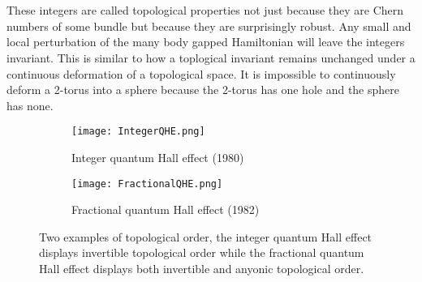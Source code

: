 \\\\
These integers are called topological properties not just because they are Chern numbers of some bundle but because they are surprisingly robust. Any small and local perturbation of the many body gapped Hamiltonian will leave the integers invariant. This is similar to how a toplogical invariant remains unchanged under a continuous deformation of a topological space. It is impossible to continuously deform a 2-torus into a sphere because the 2-torus has one hole and the sphere has none.
\begin{figure}
	\centering
	\begin{subfigure}[b]{0.45\textwidth}
		\centering
		\texttt{[image: IntegerQHE.png]}
		\caption{Integer quantum Hall effect (1980)}
	\end{subfigure}
	\hfill
	\begin{subfigure}[b]{0.45\textwidth}
		\centering
		\texttt{[image: FractionalQHE.png]}
		\caption{Fractional quantum Hall effect (1982)}
	\end{subfigure}
	\caption{Two examples of topological order, the integer quantum Hall effect displays invertible topological order while the fractional quantum Hall effect displays both invertible and anyonic topological order.}
	\label{fig:TopologicalOrderFigures}
\end{figure}
